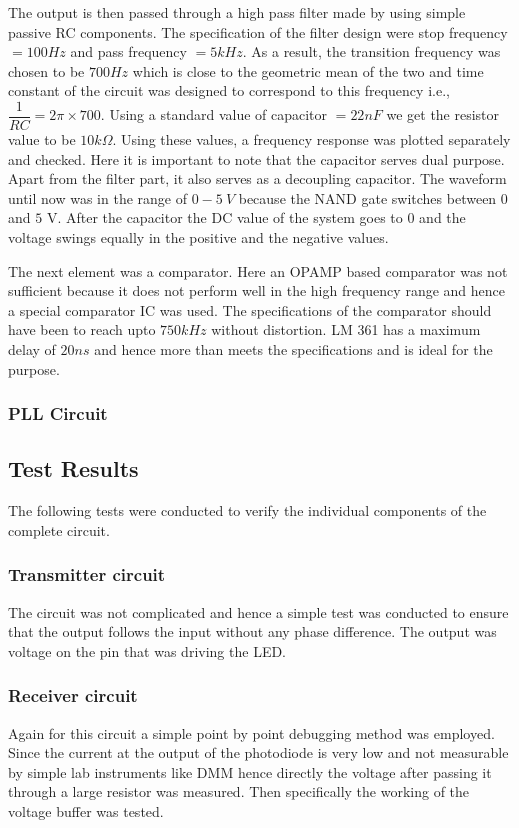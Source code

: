 \documentclass{article}
\begin{document}
The output is then passed through a high pass filter made by using simple passive RC components. The specification of the filter design were stop frequency $ = 100 Hz$ and pass frequency $ = 5 kHz $. As a result, the transition frequency was chosen to be $ 700 Hz $ which is close to the geometric mean of the two and time constant of the circuit was designed to correspond to this frequency i.e., $ \dfrac{1}{RC} = 2 \pi \times 700 $. Using a standard value of capacitor $ =  22 nF $ we get the resistor value to be $ 10 k \Omega $. Using these values, a frequency response was plotted separately and checked. Here it is important to note that the capacitor serves dual purpose. Apart from the filter part, it also serves as a decoupling capacitor. The waveform until now was in the range of $ 0-5 \  V $ because the NAND gate switches between $0$ and $5$ V. After the capacitor the DC value of the system goes to $0$ and the voltage swings equally in the positive and the negative values.

The next element was a comparator. Here an OPAMP based comparator was not sufficient because it does not perform well in the high frequency range and hence a special comparator IC was used. The specifications of the comparator should have been to reach upto $ 750 kHz $ without distortion. LM 361 has a maximum delay of $20 ns$ and hence more than meets the specifications and is ideal for the purpose.

\subsubsection{PLL Circuit}

\subsection{Test Results}
The following tests were conducted to verify the individual components of the complete circuit.
\subsubsection{Transmitter circuit}
The circuit was not complicated and hence a simple test was conducted to ensure that the output follows the input without any phase difference. The output was voltage on the pin that was driving the LED.
\subsubsection{Receiver circuit}
Again for this circuit a simple point by point debugging method was employed. Since the current at the output of the photodiode is very low and not measurable by simple lab instruments like DMM hence directly the voltage after passing it through a large resistor was measured. Then specifically the working of the voltage buffer was tested.
\end{document}
